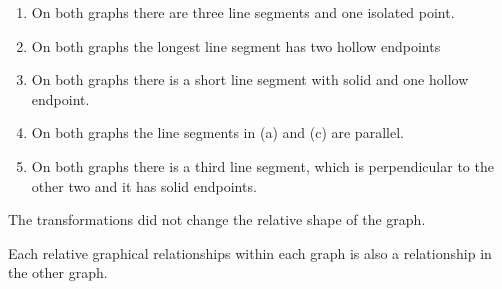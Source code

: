 \documentclass{ximera}
\begin{document}
\begin{image}
\end{image}




\begin{enumerate}
\item On both graphs there are three line segments and one isolated point.
\item On both graphs the longest line segment has two hollow endpoints
\item On both graphs there is a short line segment with solid and one hollow endpoint. 
\item On both graphs the line segments in (a) and (c) are parallel.
\item On both graphs there is a third line segment, which is perpendicular to the other two and it has solid endpoints.
\end{enumerate}




The transformations did not change the relative shape of the graph.



Each relative graphical relationships within each graph is also a relationship in the other graph. 
\end{document}

